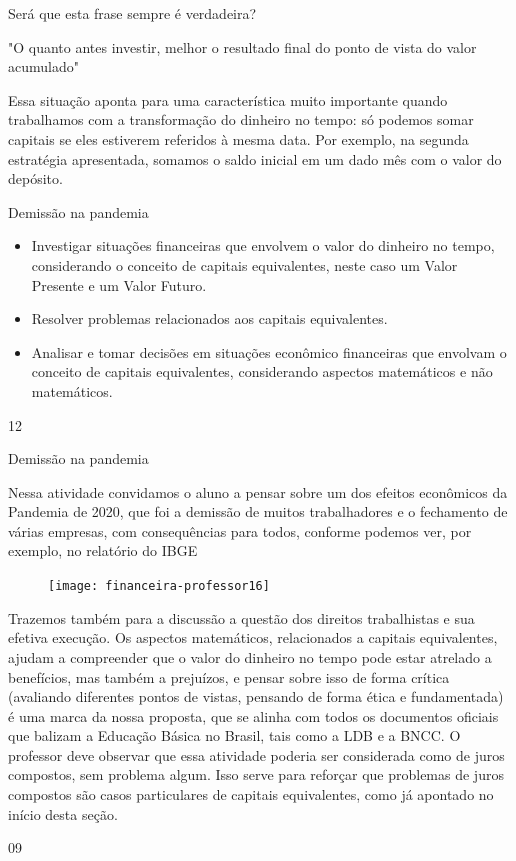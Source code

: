\begin{reflection}
Será que esta frase sempre é verdadeira?

"O quanto antes investir, melhor o resultado final do ponto de vista do valor acumulado"
\end{reflection}


Essa situação aponta para uma característica muito importante quando trabalhamos com a transformação do dinheiro no tempo: só podemos somar capitais se eles estiverem referidos à mesma data. Por exemplo, na segunda estratégia apresentada, somamos o saldo inicial em um dado mês com o valor do depósito.
\clearpage
\def\currentcolor{session2}
\begin{objectives}{Demissão na pandemia}
{
\begin{itemize}
\item Investigar situações financeiras que envolvem o valor do dinheiro no tempo, considerando o conceito de capitais equivalentes, neste caso um Valor Presente e um Valor Futuro. 
\item Resolver problemas relacionados aos capitais equivalentes.
\item Analisar e tomar decisões em situações econômico financeiras que envolvam o conceito de capitais equivalentes, considerando aspectos matemáticos e não matemáticos.
\end{itemize}
}{1}{2}
\end{objectives}
\begin{sugestions}{Demissão na pandemia}
{
Nessa atividade convidamos o aluno a pensar sobre um dos efeitos econômicos da Pandemia de 2020, que foi a demissão de muitos trabalhadores e o fechamento de várias empresas, com consequências para todos, conforme podemos ver, por exemplo, no relatório do IBGE 
 
\begin{figure}[H]
\centering

\texttt{[image: financeira-professor16]}
\end{figure}

Trazemos também para a discussão a questão dos direitos trabalhistas e sua efetiva execução. Os aspectos matemáticos, relacionados a capitais equivalentes, ajudam a compreender que o valor do dinheiro no tempo pode estar atrelado a benefícios, mas também a prejuízos, e pensar sobre isso de forma crítica (avaliando diferentes pontos de vistas, pensando de forma ética e fundamentada) é uma marca da nossa proposta, que se alinha com todos os documentos oficiais que balizam a Educação Básica no Brasil, tais como a LDB e a BNCC.
O professor deve observar que essa atividade poderia ser considerada como de juros compostos, sem problema algum. Isso serve para reforçar que problemas de juros compostos são casos particulares de capitais equivalentes, como já apontado no início desta seção.

}{0}{9}
\end{sugestions}

